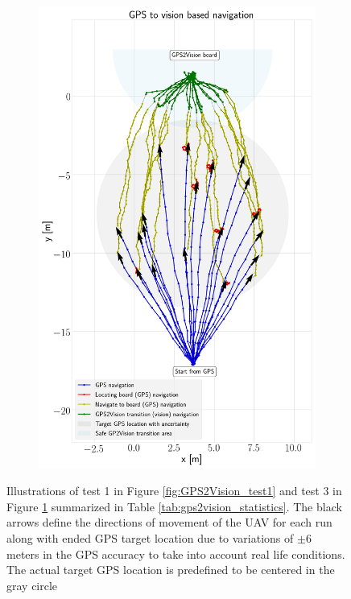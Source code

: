 \documentclass[../Head/report.tex]{subfiles}
\begin{document}
\begin{figure}[H]
\begin{subfigure}[t]{.45\textwidth}
        \includegraphics[width=\textwidth]{../Figures/GPS2Vision/test3_7-10ms_wind_20_runs/gps2vision.png}
        \caption{}
        \label{fig:GPS2Vision_test3}
    \end{subfigure}
    \caption{Illustrations of test 1 in Figure \ref{fig:GPS2Vision_test1} and test 3 in Figure \ref{fig:GPS2Vision_test3} summarized in Table \ref{tab:gps2vision_statistics}. The black arrows define the directions of movement of the UAV for each run along with ended GPS target location due to variations of $\pm 6$ meters in the GPS accuracy to take into account real life conditions. The actual target GPS location is predefined to be centered in the gray circle}
    \label{fig:GPS2Vision_test1_test3}
\end{figure}
\end{document}
